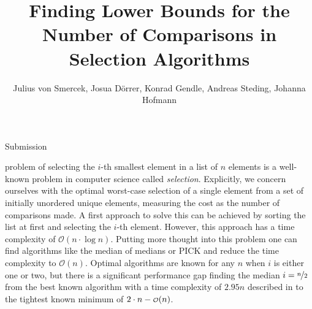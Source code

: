 \documentclass[10pt,journal,compsoc]{IEEEtran}
\newcommand\smallO{
  \mathchoice
    {{\scriptstyle\mathcal{O}}}%
    {{\scriptstyle\mathcal{O}}}%
    {{\scriptscriptstyle\mathcal{O}}}%
    {\scalebox{.50}{$\scriptscriptstyle\mathcal{O}$}}%
  }
\begin{document}
\title{Finding Lower Bounds for the Number of Comparisons in Selection Algorithms}
\author{Julius von Smercek, Josua Dörrer, Konrad Gendle, Andreas Steding, Johanna Hofmann%
  }

%
{Submission}



\maketitle

\IEEEdisplaynontitleabstractindextext


\IEEEpeerreviewmaketitle

  problem of selecting the $i$-th smallest element in a
list of $n$ elements is a well-known problem in computer science called
\textit{selection}. Explicitly, we concern ourselves with the optimal worst-case
selection of a single element from a set of initially unordered unique elements,
measuring the cost as the number of comparisons made. A first approach to solve
this can be achieved by sorting the list at first and selecting the $i$-th
element. However, this approach has a time complexity of $\mathcal{O}(n \cdot
  \log n)$. Putting more thought into this problem one can find algorithms like
the median of medians \cite{Schoening1993} or PICK
\cite{Blum1972} and reduce the time complexity to $\mathcal{O}(n)$.
Optimal algorithms are known for any $n$ when $i$ is either one or two, but
there is a significant performance gap finding the median $i = \nicefrac{n}{2}$
from the best known algorithm with a time complexity of $2.95n$ described in
\cite{dor1999selecting} to the tightest known minimum of $2 \cdot n -
  \smallO(n)$.
\end{document}
